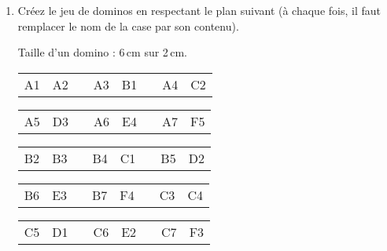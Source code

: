 \begin{TP}
\begin{enumerate}
    \item Créez le jeu de dominos en respectant le plan suivant (à chaque fois, il faut remplacer le nom de la case par son contenu).
    
    Taille d'un domino : 6\,cm sur 2\,cm.
    
    \vspace{1em}
    \begin{center}
        \renewcommand*\tabularxcolumn[1]{>{\centering\arraybackslash}m{#1}}
        \begin{tabularx}{.6\linewidth}{|X|X|X|X|X|X|X|X|}
        \cline{1-2} \cline{4-5} \cline{7-8}
            A1 & A2 & & A3 & B1 & & A4 & C2 \\ \cline{1-2} \cline{4-5} \cline{7-8}
        \end{tabularx}
        \vspace{.5em}
        
        \begin{tabularx}{.6\linewidth}{|X|X|X|X|X|X|X|X|}
        \cline{1-2} \cline{4-5} \cline{7-8}
            A5 & D3 & & A6 & E4 & & A7 & F5 \\ \cline{1-2} \cline{4-5} \cline{7-8}
        \end{tabularx}
        \vspace{.5em}
        
        \begin{tabularx}{.6\linewidth}{|X|X|X|X|X|X|X|X|}
        \cline{1-2} \cline{4-5} \cline{7-8}
            B2 & B3 & & B4 & C1 & & B5 & D2 \\ \cline{1-2} \cline{4-5} \cline{7-8}
        \end{tabularx}
        \vspace{.5em}
        
        \begin{tabularx}{.6\linewidth}{|X|X|X|X|X|X|X|X|}
        \cline{1-2} \cline{4-5} \cline{7-8}
            B6 & E3 & & B7 & F4 & & C3 & C4 \\ \cline{1-2} \cline{4-5} \cline{7-8}
        \end{tabularx}
        \vspace{.5em}
        
        \begin{tabularx}{.6\linewidth}{|X|X|X|X|X|X|X|X|}
        \cline{1-2} \cline{4-5} \cline{7-8}
            C5 & D1 & & C6 & E2 & & C7 & F3 \\ \cline{1-2} \cline{4-5} \cline{7-8}
        \end{tabularx}
        \vspace{.5em}
        

\end{center}
\end{enumerate}
\end{TP}
